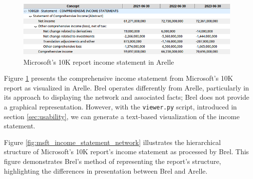 \begin{figure}[H]
  \centering
    \includegraphics[width=1\textwidth]{images/msft_income_statement_arelle.png}
    \caption{Microsoft's 10K report income statement in Arelle}
    \label{fig:msft_income_statement_arelle}
\end{figure}


Figure \ref{fig:msft_income_statement_arelle} presents the comprehensive income statement from Microsoft's 10K report as visualized in Arelle.  
Brel operates differently from Arelle, particularly in its approach to displaying the network and associated facts; Brel does not provide a graphical representation.  
However, with the \texttt{viewer.py} script, introduced in section \ref{sec:usability},  
we can generate a text-based visualization of the income statement.

Figure \ref{fig:msft_income_statement_network} illustrates the hierarchical structure of Microsoft's 10K report's income statement as processed by Brel.  
This figure demonstrates Brel's method of representing the report's structure, highlighting the differences in presentation between Brel and Arelle.

